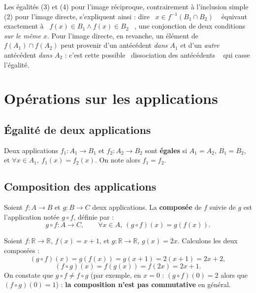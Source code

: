 \documentclass[a4paper,12pt,openany]{book}
\providecommand{\og}{\guillemotleft~}
\providecommand{\fg}{\ifhmode~\fi\guillemotright}
\begin{document}
\begin{remarque}
Les égalités (3) et (4) pour l'image réciproque, contrairement à
l'inclusion simple (2) pour l'image directe, s'expliquent ainsi : dire
\og $x \in f^{-1}(B_1\cap B_2)$ \fg{} équivaut exactement à
\og $f(x)\in B_1 \wedge f(x) \in B_2$ \fg, une conjonction de deux
conditions \emph{sur le même $x$}. Pour l'image directe, en revanche, un
élément de $f(A_1)\cap f(A_2)$ peut provenir d'un antécédent \emph{dans
$A_1$} et d'un \emph{autre} antécédent \emph{dans $A_2$} : c'est cette
possible \og dissociation des antécédents \fg{} qui casse l'égalité.
\end{remarque}

\section{Opérations sur les applications}

\subsection{Égalité de deux applications}

\begin{definition}[3.3]
Deux applications $f_1 : A_1 \to B_1$ et $f_2 : A_2 \to B_2$ sont
\textbf{égales} si $A_1=A_2$, $B_1=B_2$, et $\forall x \in A_1,\ f_1(x) =
f_2(x)$. On note alors $f_1=f_2$.
\end{definition}


\subsection{Composition des applications}


\begin{definition}[3.4]
Soient $f : A \to B$ et $g : B \to C$ deux applications. La \textbf{composée}
de $f$ suivie de $g$ est l'application notée $g\circ f$, définie par :
\[
g \circ f : A \longrightarrow C, \qquad \forall x \in A,\ (g\circ f)(x) = g(f(x)).
\]
\end{definition}


\begin{exemple}[3.3]
Soient $f : \mathbb{R} \to \mathbb{R}$, $f(x)=x+1$, et $g : \mathbb{R} \to
\mathbb{R}$, $g(x)=2x$. Calculons les deux composées :
\[
(g\circ f)(x) = g(f(x)) = g(x+1) = 2(x+1) = 2x+2,
\]
\[
(f\circ g)(x) = f(g(x)) = f(2x) = 2x+1.
\]
On constate que $g\circ f \neq f \circ g$ (par exemple, en $x=0$ :
$(g\circ f)(0)=2$ alors que $(f\circ g)(0)=1$) : \textbf{la composition
n'est pas commutative} en général.
\end{exemple}
\end{document}
